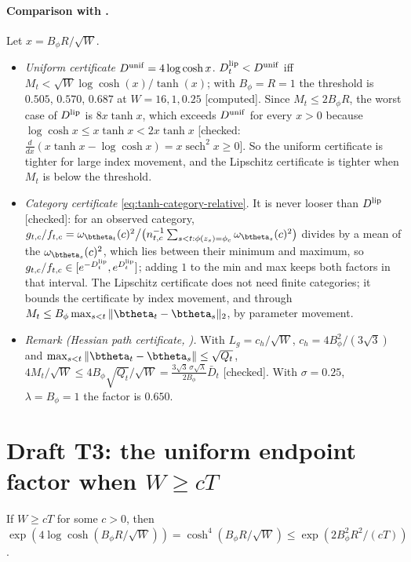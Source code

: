 \paragraph{Comparison with .} Let
$x=B_\phi R/\sqrt W$.
\begin{itemize}
\item \emph{Uniform certificate} $D^{\rm unif}=4\log\cosh x$. $D_t^{\rm lip}<D^{\rm unif}$
iff $M_t<\sqrt W\log\cosh(x)/\tanh(x)$; with $B_\phi=R=1$ the threshold is
$0.505$, $0.570$, $0.687$ at $W=16,1,0.25$ [computed]. Since
$M_t\le2B_\phi R$, the worst case of $D^{\rm lip}$ is $8x\tanh x$, which exceeds
$D^{\rm unif}$ for every $x>0$ because $\log\cosh x\le x\tanh x<2x\tanh x$
[checked: $\frac{d}{dx}(x\tanh x-\log\cosh x)=x\operatorname{sech}^2x\ge0$].
So the uniform certificate is tighter for large index movement, and the
Lipschitz certificate is tighter when $M_t$ is below the threshold.
\item \emph{Category certificate} \eqref{eq:tanh-category-relative}. It is never
looser than $D^{\rm lip}$ [checked]: for an observed category,
$g_{t,c}/f_{t,c}=\omega_{\btheta_t}(c)^2\big/\big(n_{t,c}^{-1}\sum_{s<t:\phi(z_s)=\phi_c}\omega_{\btheta_s}(c)^2\big)$
divides by a mean of the $\omega_{\btheta_s}(c)^2$, which lies between their
minimum and maximum, so $g_{t,c}/f_{t,c}\in[e^{-D_t^{\rm lip}},e^{D_t^{\rm lip}}]$; adding $1$ to
the min and max keeps both factors in that interval. The Lipschitz
certificate does not need finite categories; it bounds the certificate by
index movement, and through $M_t\le B_\phi\max_{s<t}\|\btheta_t-\btheta_s\|_2$, by
parameter movement.
\item \emph{Remark (Hessian path certificate, ).} With
$L_g=c_h/\sqrt W$, $c_h=4B_\phi^2/(3\sqrt3)$ and
$\max_{s<t}\|\btheta_t-\btheta_s\|\le\sqrt{Q_t}$,
$4M_t/\sqrt W\le4B_\phi\sqrt{Q_t}/\sqrt W=\frac{3\sqrt3\,\sigma\sqrt\lambda}{2B_\phi}\bar D_t$
[checked]. With $\sigma=0.25$, $\lambda=B_\phi=1$ the factor is $0.650$.
\end{itemize}

\section*{Draft T3: the uniform endpoint factor when $W\ge cT$}

\begin{corollary}\label{cor:tanh-endpoint-regime}
If $W\ge cT$ for some $c>0$, then
$\exp(4\log\cosh(B_\phi R/\sqrt W))=\cosh^4(B_\phi R/\sqrt W)\le\exp(2B_\phi^2R^2/(cT))$.
\end{corollary}

